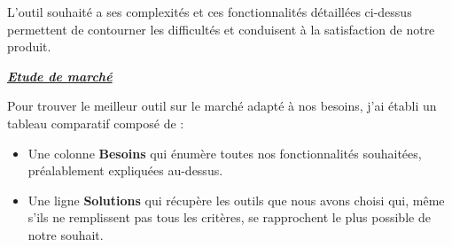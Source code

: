 \documentclass[11pt]{report}
\begin{document}
\hspace{1cm} L’outil souhaité a ses complexités et ces fonctionnalités détaillées ci-dessus permettent de contourner les difficultés et conduisent à la satisfaction de notre produit.
\quad

\hspace{1cm} \underline{\textbf{\textit{Etude de marché}}}
\quad

\hspace{1cm}Pour trouver le meilleur outil sur le marché adapté à nos besoins, j’ai établi un tableau comparatif composé de :
\begin{itemize}
	\item Une colonne \textbf{Besoins} qui énumère toutes nos fonctionnalités souhaitées, préalablement expliquées au-dessus.

	\item Une ligne \textbf{Solutions} qui récupère les outils que nous avons choisi qui, même s’ils ne remplissent pas tous les critères, se rapprochent le plus possible de notre souhait. 
\end{itemize}
\end{document}
